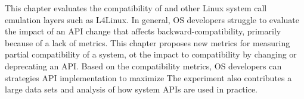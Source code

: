 This chapter evaluates the compatibility of \graphene{}
and other Linux system call emulation layers such as L4Linux.
In general, OS developers struggle to evaluate the impact of an API 
change that affects backward-compatibility,
primarily because of a lack of metrics.
This chapter proposes new metrics for measuring 
partial compatibility of a system, ot the impact to compatibility by changing or deprecating an API.
Based on the compatibility metrics,
OS developers can strategies API implementation to maximize 
The experiment also contributes a large data sets and analysis of
how system APIs are used in practice.


